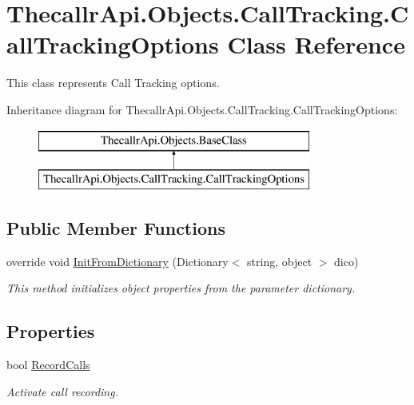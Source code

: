 \hypertarget{class_thecallr_api_1_1_objects_1_1_call_tracking_1_1_call_tracking_options}{\section{Thecallr\+Api.\+Objects.\+Call\+Tracking.\+Call\+Tracking\+Options Class Reference}
\label{class_thecallr_api_1_1_objects_1_1_call_tracking_1_1_call_tracking_options}
}


This class represents Call Tracking options.  


Inheritance diagram for Thecallr\+Api.\+Objects.\+Call\+Tracking.\+Call\+Tracking\+Options\+:\begin{figure}[H]
\begin{center}
\leavevmode
\includegraphics[height=2.000000cm]{class_thecallr_api_1_1_objects_1_1_call_tracking_1_1_call_tracking_options}
\end{center}
\end{figure}
\subsection*{Public Member Functions}
\begin{DoxyCompactItemize}
\item 
override void \hyperlink{class_thecallr_api_1_1_objects_1_1_call_tracking_1_1_call_tracking_options_a8a8fd96ebca3d45ece5ea8a9b38c021b}{Init\+From\+Dictionary} (Dictionary$<$ string, object $>$ dico)
\begin{DoxyCompactList}\small\item\em This method initializes object properties from the parameter dictionary. \end{DoxyCompactList}\end{DoxyCompactItemize}
\subsection*{Properties}
\begin{DoxyCompactItemize}
\item 
bool \hyperlink{class_thecallr_api_1_1_objects_1_1_call_tracking_1_1_call_tracking_options_a9da9a39ec1dfd7699966699da95c920f}{Record\+Calls}
\begin{DoxyCompactList}\small\item\em Activate call recording. \end{DoxyCompactList}\end{DoxyCompactItemize}


